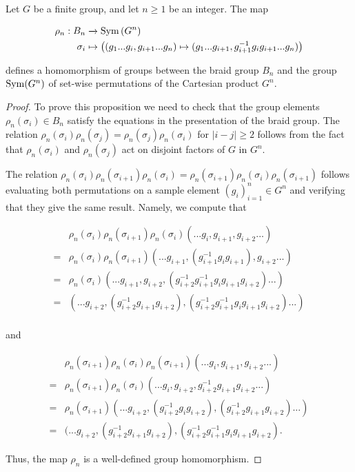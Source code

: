 \begin{prop} Let $G$ be a finite group, and let $n\geq 1$ be an integer. The map

\begin{align*}
\rho_n: B_n &\xrightarrow{} \operatorname{Sym}\left(G^n\right)\\
\sigma_i &\mapsto \left((g_1... g_i, g_{i+1} ... g_n)\mapsto (g_1... g_{i+1}, g_{i+1}^{-1}g_i g_{i+1} ... g_n) \right)
\end{align*}

defines a homomorphism of groups between the braid group $B_n$ and the group $\operatorname{Sym}(G^n)$ of set-wise permutations of the Cartesian product $G^n$.
\end{prop}
\begin{proof} To prove this proposition we need to check that the group elements $\rho_n(\sigma_i)\in B_n$ satisfy the equations in the presentation of the braid group. The relation $\rho_n(\sigma_i)\rho_n(\sigma_j)=\rho_n(\sigma_j)\rho_n(\sigma_i)$ for $|i-j|\geq 2$ follows from the fact that $\rho_n(\sigma_i)$ and $\rho_n(\sigma_j)$ act on disjoint factors of $G$ in $G^n$.

The relation $\rho_n(\sigma_i)\rho_n(\sigma_{i+1})\rho_n(\sigma_i)=\rho_n(\sigma_{i+1})\rho_n(\sigma_i)\rho_n(\sigma_{i+1})$ follows evaluating both permutations on a sample element $(g_{i})_{i=1}^{n}\in G^n$ and verifying that they give the same result. Namely, we compute that

\begin{align*}
&\rho_n(\sigma_i)\rho_n(\sigma_{i+1})\rho_n(\sigma_i)(... g_{i}, g_{i+1},g_{i+2}...)\\
=&\rho_n(\sigma_i)\rho_n(\sigma_{i+1})(... g_{i+1}, (g_{i+1}^{-1}g_{i}g_{i+1}),g_{i+2}...)\\
=&\rho_n(\sigma_i)(... g_{i+1},g_{i+2}, (g_{i+2}^{-1}g_{i+1}^{-1}g_{i}g_{i+1}g_{i+2})...)\\
=&(... g_{i+2},(g_{i+2}^{-1}g_{i+1}g_{i+2}), (g_{i+2}^{-1}g_{i+1}^{-1}g_{i}g_{i+1}g_{i+2})...)\\
\end{align*}

and 

\begin{align*}
&\rho_n(\sigma_{i+1})\rho_n(\sigma_{i})\rho_n(\sigma_{i+1})(... g_{i}, g_{i+1},g_{i+2}...)\\
=&\rho_n(\sigma_{i+1})\rho_n(\sigma_{i})(... g_{i}, g_{i+2},g_{i+2}^{-1}g_{i+1}g_{i+2}...)\\
=&\rho_n(\sigma_{i+1})(... g_{i+2}, (g_{i+2}^{-1}g_{i}g_{i+2}),(g_{i+2}^{-1}g_{i+1}g_{i+2})...)\\
=&(... g_{i+2}, (g_{i+2}^{-1}g_{i+1}g_{i+2}), (g_{i+2}^{-1}g^{-1}_{i+1}g_{i}g_{i+1}g_{i+2}).
\end{align*}

Thus, the map $\rho_n$ is a well-defined group homomorphism.
\end{proof}

